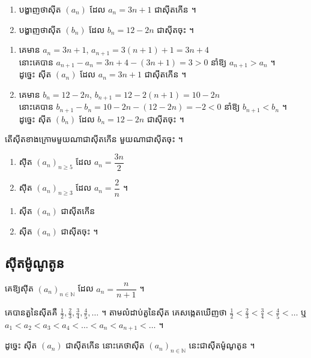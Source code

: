 \begin{example}[លំហាត់គំរូ]
\begin{enumerate}[a]
  \item បង្ហាញថាស៊ីត $(a_n)$ ដែល $a_n = 3n + 1$ ជាស៊ីតកើន ។
  \item បង្ហាញថាស៊ីត $(b_n)$ ដែល $b_n = 12 - 2n$ ជាស៊ីតចុះ ។
\end{enumerate}
\end{example}
\ans
\begin{enumerate}[a]
  \item គេមាន $a_n = 3n + 1$, $a_{n+1} = 3(n+1) + 1 = 3n + 4$\\
  នោះគេបាន $a_{n+1} - a_n = 3n + 4 - (3n + 1) = 3 > 0$ នាំឱ្យ $a_{n+1} > a_n$ ។\\
  ដូច្នេះ ស៊ីត $(a_n)$ ដែល $a_n = 3n + 1$ ជាស៊ីតកើន ។
  \item គេមាន $b_n = 12 - 2n$, $b_{n+1} = 12 - 2(n+1) = 10 - 2n$\\
  នោះគេបាន $b_{n+1} - b_n = 10 - 2n - (12 - 2n) = -2 < 0$ នាំឱ្យ $b_{n+1} < b_n$ ។\\
  ដូច្នេះ ស៊ីត $(b_n)$ ដែល $b_n = 12 - 2n$ ជាស៊ីតចុះ ។
\end{enumerate}

\begin{pro}
តើស៊ីតខាងក្រោមមួយណាជាស៊ីតកើន មួយណាជាស៊ីតចុះ ។
\begin{enumerate}[a]
  \item ស៊ីត $(a_n)_{n \ge 5}$ ដែល $a_n = \dfrac{3n}{2}$
  \item ស៊ីត $(a_n)_{n \ge 3}$ ដែល $a_n = \dfrac{2}{n}$ ។
\end{enumerate}
\ans
\begin{enumerate}[a]
  \item ស៊ីត $(a_n)$ ជាស៊ីតកើន
  \item ស៊ីត $(a_n)$ ជាស៊ីតចុះ ។
\end{enumerate}
\end{pro}

\subsection{ស៊ីតម៉ូណូតូន}

\begin{example}[ឧទាហរណ៍ ១]
គេឱ្យស៊ីត $(a_n)_{n \in \mathbb{N}}$ ដែល $a_n = \dfrac{n}{n+1}$ ។

គេបានតួនៃស៊ីតគឺ $\frac{1}{2}, \frac{2}{3}, \frac{3}{4}, \frac{4}{5}, \ldots$ ។ តាមលំដាប់តួនៃស៊ីត គេសង្កេតឃើញថា $\frac{1}{2} < \frac{2}{3} < \frac{3}{4} < \frac{4}{5} < \ldots$ ឬ $a_1 < a_2 < a_3 < a_4 < \ldots < a_n < a_{n+1} < \ldots$ ។

ដូច្នេះ ស៊ីត $(a_n)$ ជាស៊ីតកើន នោះគេថាស៊ីត $(a_n)_{n \in \mathbb{N}}$ នេះជាស៊ីតម៉ូណូតូន ។
\end{example}

